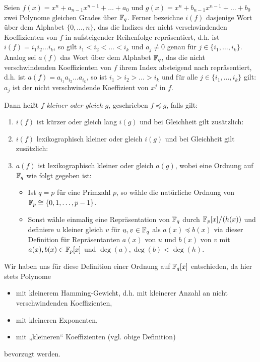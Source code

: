 \begin{definition}
  \label{def:polynomordnung}
  Seien $f(x) = x^n+a_{n-1}x^{n-1}+\ldots+a_0$ und
  $g(x) = x^n + b_{n-1}x^{n-1}+\ldots+b_0$ zwei Polynome gleichen Grades über 
  $\mathbb{F}_q$. Ferner bezeichne $i(f)$ dasjenige Wort über dem Alphabet
  $\{ 0,\ldots,n\}$, das die Indizes der nicht verschwindenden 
  Koeffizienten von $f$ in
  aufsteigender Reihenfolge repräsentiert, d.h. ist $i(f) = i_1i_2\ldots i_k$,
  so gilt $i_1<i_2<\ldots<i_k$ und $a_{j} \neq 0$ genau für 
  $j \in \{i_1,\ldots,i_k\}$. Analog sei $a(f)$ das Wort über dem Alphabet 
  $\mathbb{F}_q$, das die nicht verschwindenden Koeffizienten von $f$ 
  ihrem Index absteigend nach repräsentiert, d.h. ist 
  $a(f) = a_{i_1}a_{i_2}\ldots a_{i_k}$, so ist 
  $i_1>i_2>\ldots>i_k$ und für alle $j \in \{i_1,\ldots,i_k\}$ gilt:
  $a_{j}$ ist der nicht verschwindende Koeffizient
  von $x^{j}$ in $f$.

  Dann heißt $f$ \emph{kleiner oder gleich} $g$, 
  geschrieben $f\preceq g$, falls gilt:
  \begin{enumerate}
    \item $i(f)$ ist kürzer oder gleich lang $i(g)$
      und bei Gleichheit gilt zusätzlich:
    \item $i(f)$ lexikographisch kleiner oder gleich $i(g)$ und bei
      Gleichheit gilt zusätzlich:
    \item $a(f)$ ist lexikographisch kleiner oder gleich $a(g)$, 
      wobei eine Ordnung auf $\mathbb{F}_q$ wie folgt gegeben ist:
      \begin{itemize}
        \item Ist $q = p$ für eine Primzahl $p$, so wähle die natürliche Ordnung von
          $\mathbb{F}_p \cong \{ 0,1,\ldots,p-1\}$.
        \item Sonst wähle einmalig eine Repräsentation von 
          $\mathbb{F}_q$ durch $\mathbb{F}_p[x]\big/(h(x))$ und definiere 
          $u$ kleiner gleich $v$ für $u,v\in \mathbb{F}_q$ als
          $a(x) \preceq b(x)$ via dieser Definition für
          Repräsentanten $a(x)$ von $u$ und $b(x)$ von $v$ mit
          $a(x),b(x) \in \mathbb{F}_p[x]$ und $\deg(a),\deg(b) < \deg(h)$.
      \end{itemize}
  \end{enumerate}
\end{definition}


Wir haben uns für diese Definition einer Ordnung auf $\mathbb{F}_q[x]$ entschieden, da
hier stets Polynome 
\begin{itemize}
  \item mit kleinerem Hamming-Gewicht, d.h. mit kleinerer Anzahl an 
    nicht verschwindenden Koeffizienten, 
  \item mit kleineren Exponenten,
  \item mit „kleineren“ Koeffizienten (vgl. obige Definition)
\end{itemize}
bevorzugt werden.

